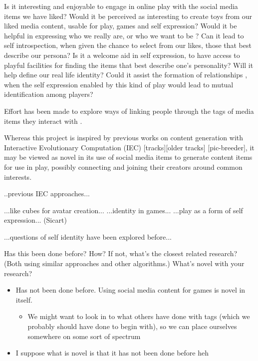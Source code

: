 \documentclass[]{article}
\begin{document}
Is it interesting and enjoyable to engage in online play with the social media items we have liked?  Would it be perceived as interesting to create toys from our liked media content, usable for play, games and self expression?   Would it be helpful in expressing who we really are, or who we want to be \cite{przybylski2012ideal}?  Can it lead to self introspection, when given the chance to select from our likes, those that best describe our persona?  
Is it a welcome aid in self expression, to have access to playful facilities for finding the items that best describe one's personality?
Will it help define our real life identity?  Could it assist the formation of relationships \cite{vitak2008facebook}, when the self expression enabled by this kind of play would lead to mutual identification \cite{kimmel1966game} among players?

 Effort has been made to explore ways of linking people through the tags of media items they interact with \cite{guy2010social,hung2008tag}.  

Whereas this project is inspired by previous works on content generation with Interactive Evolutionary Computation (IEC) [tracks][older tracks] [pic-breeder], it may be viewed as novel in its use of social media items to generate content items for use in play, possibly connecting and joining their creators around common interests.


..previous IEC approaches...

...like cubes for avatar creation...
...identity in games...
...play as a form of self expression... (Sicart)

...questions of self identity have been explored before...


\begin{framed}
Has this been done before? How? If not, what’s the closest related research? (Both using similar approaches and other algorithms.) What’s novel with your research?
\end{framed}

\begin{itemize}
\item Has not been done before. Using social media content for games is novel in itself.
	\begin{itemize}
	\item We might want to look in to what others have done with tags (which we probably should have done to begin with), so we can place ourselves somewhere on some sort of spectrum
	\end{itemize}
\item I suppose what is novel is that it has not been done before heh
\end{itemize}
\end{document}

